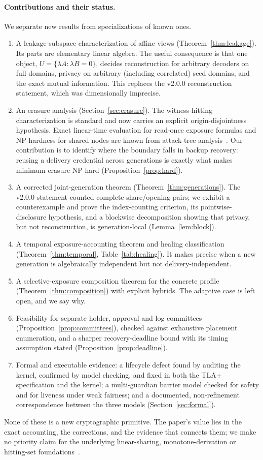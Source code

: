 \documentclass[pdflatex,sn-mathphys-num]{sn-jnl}
\theoremstyle{plain}
\theoremstyle{definition}
\begin{document}
\paragraph{Contributions and their status.}
We separate new results from specializations of known ones.
\begin{enumerate}
\item A leakage-subspace characterization of affine views (Theorem~\ref{thm:leakage}). Its parts are elementary linear algebra. The useful consequence is that one object, $U=\{\lambda A:\lambda B=0\}$, decides reconstruction for arbitrary decoders on full domains, privacy on arbitrary (including correlated) seed domains, and the exact mutual information. This replaces the v2.0.0 reconstruction statement, which was dimensionally imprecise.
\item An erasure analysis (Section~\ref{sec:erasure}). The witness-hitting characterization is standard and now carries an explicit origin-disjointness hypothesis. Exact linear-time evaluation for read-once exposure formulas and NP-hardness for shared nodes are known from attack-tree analysis~\cite{mauw2005,lopuhaa2022}. Our contribution is to identify where the boundary falls in backup recovery: reusing a delivery credential across generations is exactly what makes minimum erasure NP-hard (Proposition~\ref{prop:hard}).
\item A corrected joint-generation theorem (Theorem~\ref{thm:generations}). The v2.0.0 statement counted complete share/opening pairs; we exhibit a counterexample and prove the index-counting criterion, its pointwise-disclosure hypothesis, and a blockwise decomposition showing that privacy, but not reconstruction, is generation-local (Lemma~\ref{lem:block}).
\item A temporal exposure-accounting theorem and healing classification (Theorem~\ref{thm:temporal}, Table~\ref{tab:healing}). It makes precise when a new generation is algebraically independent but not delivery-independent.
\item A selective-exposure composition theorem for the concrete profile (Theorem~\ref{thm:composition}) with explicit hybrids. The adaptive case is left open, and we say why.
\item Feasibility for separate holder, approval and log committees (Proposition~\ref{prop:committees}), checked against exhaustive placement enumeration, and a sharper recovery-deadline bound with its timing assumption stated (Proposition~\ref{prop:deadline}).
\item Formal and executable evidence: a lifecycle defect found by auditing the kernel, confirmed by model checking, and fixed in both the TLA+ specification and the kernel; a multi-guardian barrier model checked for safety and for liveness under weak fairness; and a documented, non-refinement correspondence between the three models (Section~\ref{sec:formal}).
\end{enumerate}
None of these is a new cryptographic primitive. The paper's value lies in the exact accounting, the corrections, and the evidence that connects them; we make no priority claim for the underlying linear-sharing, monotone-derivation or hitting-set foundations~\cite{karchmer1993}.
\end{document}
